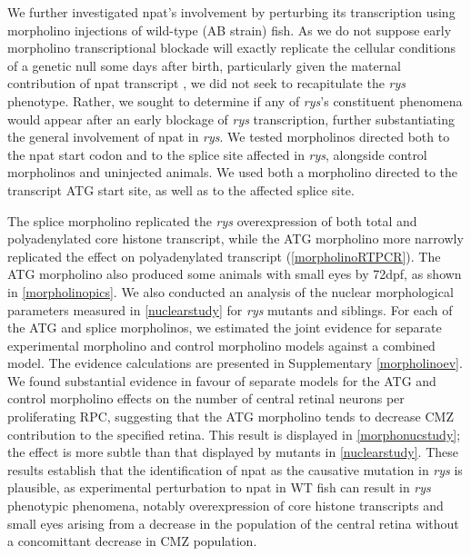 We further investigated npat's involvement by perturbing its transcription using morpholino injections of wild-type (AB strain) fish. As we do not suppose early morpholino transcriptional blockade will exactly replicate the cellular conditions of a genetic null some days after birth, particularly given the maternal contribution of npat transcript \cite{Harvey2013}, we did not seek to recapitulate the \textit{rys} phenotype. Rather, we sought to determine if any of \textit{rys}'s constituent phenomena would appear after an early blockage of \textit{rys} transcription, further substantiating the general involvement of npat in \textit{rys}. We tested morpholinos directed both to the npat start codon and to the splice site affected in \textit{rys}, alongside control morpholinos and uninjected animals. We used both a morpholino directed to the transcript ATG start site, as well as to the affected splice site. 

The splice morpholino replicated the \textit{rys} overexpression of both total and polyadenylated core histone transcript, while the ATG morpholino more narrowly replicated the effect on polyadenylated transcript (\autoref{morpholinoRTPCR}). The ATG morpholino also produced some animals with small eyes by 72dpf, as shown in \autoref{morpholinopics}. We also conducted an analysis of the nuclear morphological parameters measured in \autoref{nuclearstudy} for \textit{rys} mutants and siblings. For each of the ATG and splice morpholinos, we estimated the joint evidence for separate experimental morpholino and control morpholino models against a combined model. The evidence calculations are presented in Supplementary \autoref{morpholinoev}. We found substantial evidence in favour of separate models for the ATG and control morpholino effects on the number of central retinal neurons per proliferating RPC, suggesting that the ATG morpholino tends to decrease CMZ contribution to the specified retina. This result is displayed in \autoref{morphonucstudy}; the effect is more subtle than that displayed by mutants in \autoref{nuclearstudy}. These results establish that the identification of npat as the causative mutation in \textit{rys} is plausible, as experimental perturbation to npat in WT fish can result in \textit{rys} phenotypic phenomena, notably overexpression of core histone transcripts and small eyes arising from a decrease in the population of the central retina without a concomittant decrease in CMZ population. 

